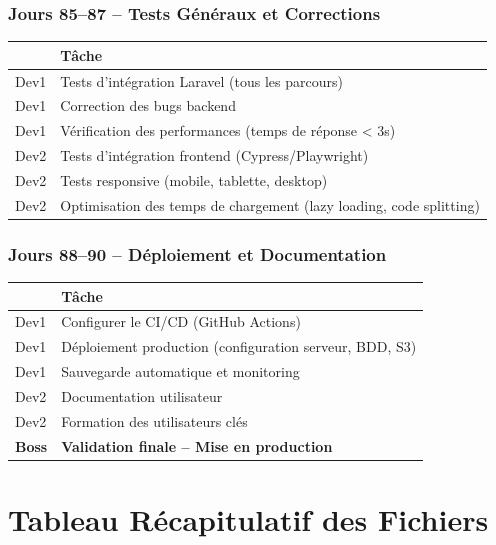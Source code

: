 \documentclass[12pt,a4paper]{report}
\begin{document}
\subsection*{Jours 85--87 -- Tests Généraux et Corrections}

\begin{tabularx}{\textwidth}{l X}
    \toprule
    & \textbf{Tâche} \\
    \midrule
    Dev1 & Tests d'intégration Laravel (tous les parcours) \\
    Dev1 & Correction des bugs backend \\
    Dev1 & Vérification des performances (temps de réponse < 3s) \\
    Dev2 & Tests d'intégration frontend (Cypress/Playwright) \\
    Dev2 & Tests responsive (mobile, tablette, desktop) \\
    Dev2 & Optimisation des temps de chargement (lazy loading, code splitting) \\
    \bottomrule
\end{tabularx}

\subsection*{Jours 88--90 -- Déploiement et Documentation}

\begin{tabularx}{\textwidth}{l X}
    \toprule
    & \textbf{Tâche} \\
    \midrule
    Dev1 & Configurer le CI/CD (GitHub Actions) \\
    Dev1 & Déploiement production (configuration serveur, BDD, S3) \\
    Dev1 & Sauvegarde automatique et monitoring \\
    Dev2 & Documentation utilisateur \\
    Dev2 & Formation des utilisateurs clés \\
    \textbf{Boss} & \textbf{Validation finale -- Mise en production} \\
    \bottomrule
\end{tabularx}

\chapter{Tableau Récapitulatif des Fichiers}
\end{document}

